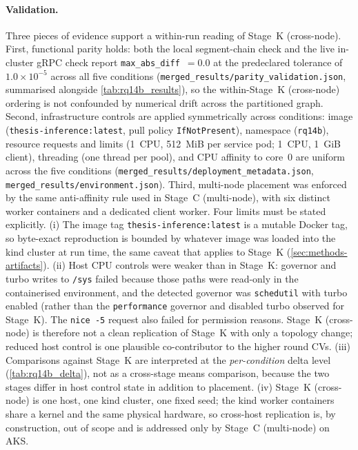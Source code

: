 \paragraph{Validation.}
Three pieces of evidence support a within-run reading of Stage~K (cross-node).
First, functional parity holds: both the local segment-chain check
and the live in-cluster gRPC check report
\texttt{max\_abs\_diff}~$=0.0$ at the predeclared tolerance of
$1.0\times10^{-5}$ across all five conditions
(\texttt{merged\_results/parity\_validation.json}, summarised
alongside \cref{tab:rq14b_results}), so the within-Stage~K (cross-node) ordering
is not confounded by numerical drift across the partitioned graph.
Second, infrastructure controls are applied symmetrically across
conditions: image (\texttt{thesis-inference:latest}, pull policy
\texttt{IfNotPresent}), namespace (\texttt{rq14b}), resource
requests and limits (1~CPU, 512~MiB per service pod; 1~CPU, 1~GiB
client), threading (one thread per pool), and CPU affinity to
core~0 are uniform across the five conditions
(\texttt{merged\_results/deployment\_metadata.json},
\texttt{merged\_results/environment.json}). Third, multi-node
placement was enforced by the same anti-affinity rule used in
Stage~C (multi-node), with six distinct worker containers and a dedicated client
worker. Four limits must be stated explicitly. (i) The image tag
\texttt{thesis-inference:latest} is a mutable Docker tag, so
byte-exact reproduction is bounded by whatever image was loaded
into the kind cluster at run time, the same caveat that applies to
Stage~K (\cref{sec:methods-artifacts}). (ii) Host CPU controls were
weaker than in Stage~K: governor and turbo writes to \texttt{/sys}
failed because those paths were read-only in the containerised
environment, and the detected governor was \texttt{schedutil} with
turbo enabled (rather than the \texttt{performance} governor and
disabled turbo observed for Stage~K). The \texttt{nice~-5} request
also failed for permission reasons. Stage~K (cross-node) is therefore not a clean
replication of Stage~K with only a topology change; reduced host
control is one plausible co-contributor to the higher round CVs.
(iii) Comparisons against Stage~K are interpreted at the
\emph{per-condition} delta level (\cref{tab:rq14b_delta}), not as a
cross-stage means comparison, because the two stages differ in host
control state in addition to placement. (iv) Stage~K (cross-node) is one host,
one kind cluster, one fixed seed; the kind worker containers share
a kernel and the same physical hardware, so cross-host replication
is, by construction, out of scope and is addressed only by Stage~C (multi-node)
on AKS.


